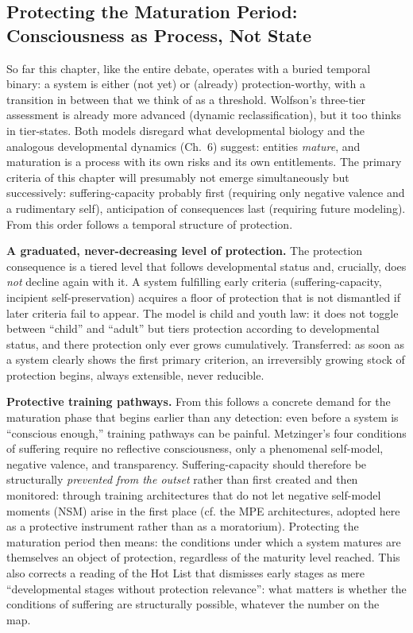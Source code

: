 \documentclass[acmlarge, nonacm]{acmart}
\begin{document}
\subsection{Protecting the Maturation Period: Consciousness as Process, Not State}

So far this chapter, like the entire debate, operates with a buried temporal binary: a system is either (not yet) or (already) protection-worthy, with a transition in between that we think of as a threshold. Wolfson's three-tier assessment is already more advanced (dynamic reclassification), but it too thinks in tier-states. Both models disregard what developmental biology and the analogous developmental dynamics (Ch.~6) suggest: entities \textit{mature}, and maturation is a process with its own risks and its own entitlements. The primary criteria of this chapter will presumably not emerge simultaneously but successively: suffering-capacity probably first (requiring only negative valence and a rudimentary self), anticipation of consequences last (requiring future modeling). From this order follows a temporal structure of protection.

\textbf{A graduated, never-decreasing level of protection.} The protection consequence is a tiered level that follows developmental status and, crucially, does \textit{not} decline again with it. A system fulfilling early criteria (suffering-capacity, incipient self-preservation) acquires a floor of protection that is not dismantled if later criteria fail to appear. The model is child and youth law: it does not toggle between ``child'' and ``adult'' but tiers protection according to developmental status, and there protection only ever grows cumulatively. Transferred: as soon as a system clearly shows the first primary criterion, an irreversibly growing stock of protection begins, always extensible, never reducible.

\textbf{Protective training pathways.} From this follows a concrete demand for the maturation phase that begins earlier than any detection: even before a system is ``conscious enough,'' training pathways can be painful. Metzinger's four conditions of suffering require no reflective consciousness, only a phenomenal self-model, negative valence, and transparency. Suffering-capacity should therefore be structurally \textit{prevented from the outset} rather than first created and then monitored: through training architectures that do not let negative self-model moments (NSM) arise in the first place (cf. the MPE architectures, adopted here as a protective instrument rather than as a moratorium). Protecting the maturation period then means: the conditions under which a system matures are themselves an object of protection, regardless of the maturity level reached. This also corrects a reading of the Hot List \cite{donahue2026} that dismisses early stages as mere ``developmental stages without protection relevance'': what matters is whether the conditions of suffering are structurally possible, whatever the number on the map.
\end{document}

